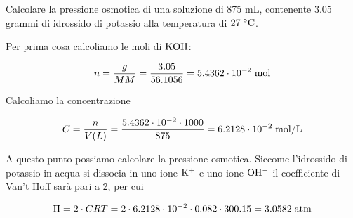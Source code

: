 \newpage

\begin{esercizio}
    Calcolare la pressione osmotica di una soluzione di 875 mL, contenente 3.05 grammi di idrossido di potassio alla temperatura di $27 \; \rm ^{\circ} C$.
\end{esercizio}
\begin{soluzione}
    Per prima cosa calcoliamo le moli di $\rm KOH$:

$$n=\frac{g}{MM}
=\frac{3.05}{56.1056}
=5.4362 \cdot 10^{-2} \; \rm mol$$

Calcoliamo la concentrazione

$$C=\frac{n}{V(L)}
=\frac{5.4362 \cdot 10^{-2} \cdot 1000}{875}
=6.2128 \cdot 10^{-2} \; \rm mol/L$$

A questo punto possiamo calcolare la pressione osmotica. Siccome l'idrossido di potassio in acqua si dissocia in uno ione $\rm K^{+}$ e uno ione $\rm OH^-$ il coefficiente di Van't Hoff sarà pari a 2, per cui

$$\Pi=2 \cdot CRT
=2 \cdot 6.2128 \cdot 10^{-2} \cdot 0.082 \cdot 300.15
=3.0582 \; \rm atm$$
\end{soluzione}
\newpage

